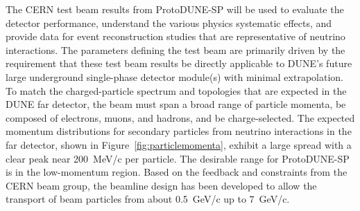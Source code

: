 The CERN test beam results from ProtoDUNE-SP will be used to evaluate the detector performance,  understand the various physics systematic effects, and provide data for event reconstruction studies that are representative of neutrino interactions. 
The parameters defining the test beam are primarily driven by the requirement that these test beam results be directly applicable to DUNE's future large underground single-phase detector module(s) with minimal extrapolation.
To match the charged-particle spectrum and topologies that are expected in the DUNE far detector, the beam must span a broad range of particle momenta, be composed of electrons, muons, and hadrons, and be charge-selected.  
The expected momentum distributions for secondary particles from neutrino interactions in the far detector, shown in Figure~\ref{fig:particlemomenta}, exhibit a large spread with a clear peak near 200~MeV/c per particle. 
The desirable range for ProtoDUNE-SP is in the low-momentum region. Based on the feedback and constraints from the CERN beam group, the beamline design has been developed to allow the transport of beam particles from about 0.5~GeV/c up to 7~GeV/c. 

